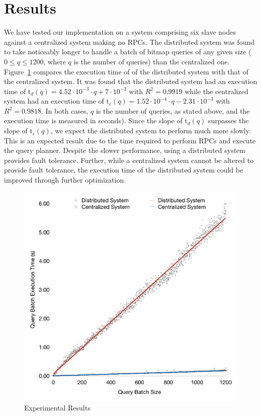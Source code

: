 \section{Results}
We have tested our implementation on a system comprising six slave nodes
against a centralized system making no RPCs. The distributed system was found
to take noticeably longer to handle a batch of bitmap queries of any given size
(\(0 \leq q \leq 1200\), where \(q\) is the number of queries) than the
centralized one. Figure~\ref{fig:graph-of-results} compares the execution time
of of the distributed system with that of the centralized system. It was found
that the distributed system had an execution time of
\(\mathrm{t}_d(q) = 4.52 \cdot 10^{-3} \cdot q + 7 \cdot 10^{-2}\)
with \(R^2 = 0.9919\) while the centralized system had an execution time of
\(\mathrm{t}_c(q) = 1.52 \cdot 10^{-4} \cdot q - 2.31 \cdot 10^{-3}\)
with \(R^2 = 0.9818\). In both cases, \(q\) is the number of queries, as stated
above, and the execution time is measured in seconds). Since the slope of
\(\mathrm{t}_d(q)\) surpasses the slope of \(\mathrm{t}_c(q)\), we expect the
distributed system to perform much more slowly. This is an expected result due
to the time required to perform RPCs and execute the query planner. Despite the
slower performance, using a distributed system provides fault tolerance.
Further, while a centralized system cannot be altered to provide fault
tolerance, the execution time of the distributed system could be improved
through further optimization.
%
\begin{figure}
    \centering
    \includegraphics[width=\columnwidth]{query-experiment-results}
    \caption{Experimental Results}\label{fig:graph-of-results}
\end{figure}
